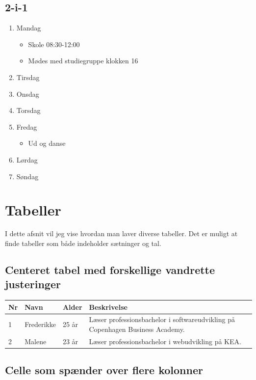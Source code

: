 \documentclass[11pt]{article}
\begin{document}
\subsection{2-i-1}
\begin{enumerate}
\item Mandag
	\begin{itemize}
	\item Skole 08:30-12:00
	\item Mødes med studiegruppe klokken 16
	\end{itemize}
\item Tirsdag
\item Onsdag
\item Torsdag
\item Fredag
	\begin{itemize}
	\item Ud og danse
	\end{itemize}
\item Lørdag
\item Søndag
\end{enumerate}
\clearpage

\section{Tabeller}
I dette afsnit vil jeg vise hvordan man laver diverse tabeller. Det er muligt at finde tabeller som både indeholder sætninger og tal. 

\subsection{Centeret tabel med forskellige vandrette justeringer}
\begin{table}[H]
\centering
\begin{tabular}{|p{0.5cm}|p{2cm}|p{1cm}|p{6cm}|} %
\hline
Nr&Navn&Alder&Beskrivelse\\ \hline %
1&Frederikke&25 år &Læser professionsbachelor i softwareudvikling på Copenhagen Business Academy.\\ \hline
2&Malene&23 år&Læser professionsbachelor i webudvikling på KEA. \\ \hline
\end{tabular}
\end{table}

\subsection{Celle som spænder over flere kolonner}
\end{document}

